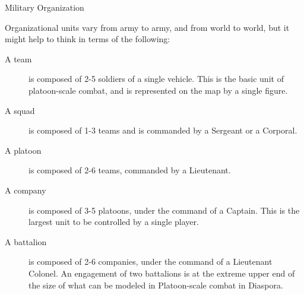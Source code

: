 \begin{sidebox}{Military Organization}

Organizational units vary from army to army, and from world to world, but it might help to think in terms of the following:

\begin{description}
\item [A team] is composed of 2-5 soldiers of a single vehicle. This is the basic unit of platoon-scale combat, and is represented on the map by a single figure.

\item [A squad] is composed of 1-3 teams and is commanded by a Sergeant or a Corporal.

\item [A platoon] is composed of 2-6 teams, commanded by a Lieutenant.

\item [A company] is composed of 3-5 platoons, under the command of a Captain. This is the largest unit to be controlled by a single player.

\item [A battalion] is composed of 2-6 companies, under the command of a Lieutenant Colonel. An engagement of two battalions is at the extreme upper end of the size of what can be modeled in Platoon-scale combat in Diaspora.
\end{description}
\end{sidebox}
